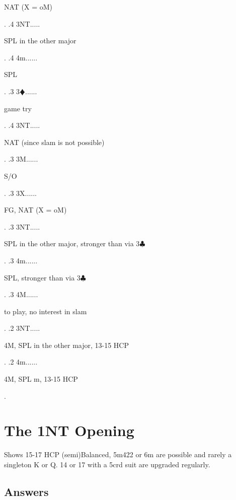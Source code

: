 \documentclass[a4paper]{article}
\newcommand{\BC}{\textcolor{OliveGreen}{$\clubsuit$}}
\newcommand{\BD}{\textcolor{RedOrange}{$\vardiamondsuit$}}
\begin{document}
{\begin{minipage}[t]{0.8\textwidth}
NAT (X = oM)
\end{minipage}. 
 .4 3NT.....\begin{minipage}[t]{0.8\textwidth}
SPL in the other major
\end{minipage}. 
 .4 4m......\begin{minipage}[t]{0.8\textwidth}
SPL
\end{minipage}. 
 .3 3\BD......\begin{minipage}[t]{0.8\textwidth}
game try
\end{minipage}. 
 .4 3NT.....\begin{minipage}[t]{0.8\textwidth}
NAT (since slam is not possible)
\end{minipage}. 
 .3 3M......\begin{minipage}[t]{0.8\textwidth}
S/O
\end{minipage}. 
 .3 3X......\begin{minipage}[t]{0.8\textwidth}
FG, NAT (X = oM)
\end{minipage}. 
 .3 3NT.....\begin{minipage}[t]{0.8\textwidth}
SPL in the other major, stronger than via 3\BC 
\end{minipage}. 
 .3 4m......\begin{minipage}[t]{0.8\textwidth}
SPL, stronger than via 3\BC 
\end{minipage}. 
 .3 4M......\begin{minipage}[t]{0.8\textwidth}
to play, no interest in slam
\end{minipage}. 
 .2 3NT.....\begin{minipage}[t]{0.8\textwidth}
4M, SPL in the other major, 13-15 HCP
\end{minipage}. 
 .2 4m......\begin{minipage}[t]{0.8\textwidth}
4M, SPL m, 13-15 HCP
\end{minipage}. 
}
\bigbreak
\section{The 1NT Opening}

Shows 15-17 HCP (semi)Balanced, 5m422 or 6m are possible and rarely a singleton
K or Q. 14 or 17 with a 5crd suit are upgraded regularly.
\bigbreak
\subsection{Answers}
\end{document}
